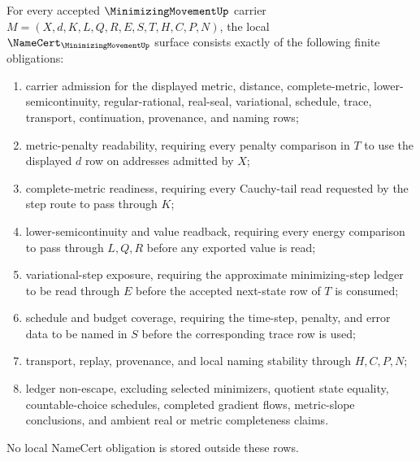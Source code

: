 \begin{theorem}
\label{thm:minimizing-movement-namecert-obligations}
For every accepted $\MinimizingMovementUp$ carrier $M=(X,d,K,L,Q,R,E,S,T,H,C,P,N)$, the local $\NameCert_{\MinimizingMovementUp}$ surface consists exactly of the following finite obligations:
\begin{enumerate}
\item carrier admission for the displayed metric, distance, complete-metric, lower-semicontinuity, regular-rational, real-seal, variational, schedule, trace, transport, continuation, provenance, and naming rows;
\item metric-penalty readability, requiring every penalty comparison in $T$ to use the displayed $d$ row on addresses admitted by $X$;
\item complete-metric readiness, requiring every Cauchy-tail read requested by the step route to pass through $K$;
\item lower-semicontinuity and value readback, requiring every energy comparison to pass through $L,Q,R$ before any exported value is read;
\item variational-step exposure, requiring the approximate minimizing-step ledger to be read through $E$ before the accepted next-state row of $T$ is consumed;
\item schedule and budget coverage, requiring the time-step, penalty, and error data to be named in $S$ before the corresponding trace row is used;
\item transport, replay, provenance, and local naming stability through $H,C,P,N$;
\item ledger non-escape, excluding selected minimizers, quotient state equality, countable-choice schedules, completed gradient flows, metric-slope conclusions, and ambient real or metric completeness claims.
\end{enumerate}
No local NameCert obligation is stored outside these rows.
\end{theorem}
